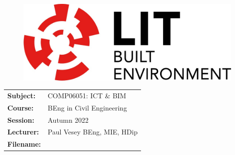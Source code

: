 \documentclass[a4paper, 10pt]{article}
\begin{document}
\lstset{language=HTML,
				basicstyle=\small,
				breaklines=true,
        numbers=left,
        numberstyle=\tiny,
        showstringspaces=false,
        aboveskip=-20pt,
        frame=leftline
        }
				
\begin{figure}
	\centering
	\includegraphics[width=0.5\linewidth]{./Assignments/img/LITlogo}
\end{figure}


\begin{tabularx}{\textwidth}{ |l|X| }
	\hline
	\textbf{Subject:} & COMP06051: ICT \& BIM\\
	\textbf{Course:} & BEng in Civil Engineering\\
	\textbf{Session:} & Autumn 2022\\
	\textbf{Lecturer:} & Paul Vesey \footnotesize{BEng, MIE, HDip}\\
	\textbf{Filename:} & \currfilebase\\
	\hline
\end{tabularx}



\vspace{0.25cm}	
\end{document}
